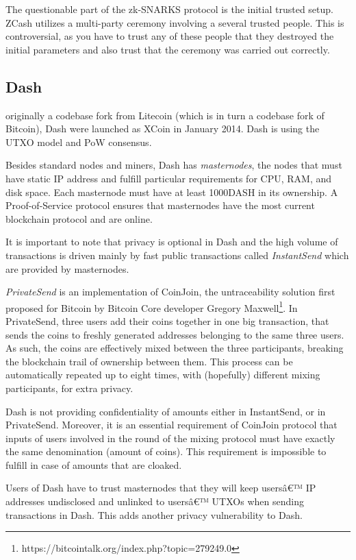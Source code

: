 \documentclass[8pt,fleqn,openany]{book}
\begin{document}
{		The questionable part of the zk-SNARKS protocol is the initial trusted setup. ZCash utilizes a multi-party ceremony involving a several trusted people. This is controversial, as you have to trust any of these people that they destroyed the initial parameters and also trust that the ceremony was carried out correctly. 
		
		\subsection{Dash} originally a codebase fork from Litecoin (which is in turn a codebase fork of Bitcoin), Dash were launched as XCoin in January 2014. Dash is using the UTXO model and PoW consensus. 
		
		Besides standard nodes and miners, Dash has \textit{masternodes}, the nodes that must have static IP address and fulfill particular requirements for CPU, RAM, and disk space. Each masternode must have at least 1000DASH in its ownership. A Proof-of-Service protocol ensures that masternodes have the most current blockchain protocol and are online. 
		
		It is important to note that privacy is optional in Dash and the high volume of transactions is driven mainly by fast public transactions called \textit{InstantSend} which are provided by masternodes.
		
		\textit{PrivateSend} is an implementation of CoinJoin, the untraceability solution first proposed for Bitcoin by Bitcoin Core developer Gregory Maxwell\footnote{https://bitcointalk.org/index.php?topic=279249.0}. In PrivateSend, three users add their coins together in one big transaction, that sends the coins to freshly generated addresses belonging to the same three users. As such, the coins are effectively mixed between the three participants, breaking the blockchain trail of ownership between them. This process can be automatically repeated up to eight times, with (hopefully) different mixing participants, for extra privacy.
		
		Dash is not providing confidentiality of amounts either in InstantSend, or in PrivateSend. Moreover, it is an essential requirement of CoinJoin protocol that inputs of users involved in the round of the mixing protocol must have exactly the same denomination (amount of coins). This requirement is impossible to fulfill in case of amounts that are cloaked. 
		
		Users of Dash have to trust masternodes that they will keep usersâ€™ IP addresses undisclosed and unlinked to usersâ€™ UTXOs when sending transactions in Dash. This adds another privacy vulnerability to Dash.
		
}
\end{document}
